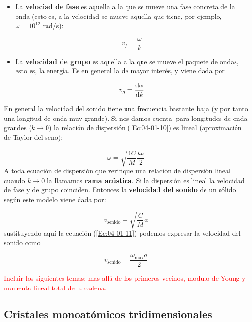 \begin{itemize}
	\item La \textbf{velociad de fase} es aquella a la que se mueve una fase concreta de la onda (esto es, a la velocidad se mueve aquella que tiene, por ejemplo, $\omega=10^{12}$ rad/s):
	
	\begin{equation}
		v_f = \frac{\omega}{k}
	\end{equation}
	\item La \textbf{velocidad de grupo} es aquella a la que se mueve el paquete de ondas, esto es, la energía. Es en general la de mayor interés, y viene dada por
	
	\begin{equation}
		v_g = \frac{\mathrm{d} \omega}{\mathrm{d} k}
	\end{equation}
\end{itemize}
En general la velocidad del sonido tiene una frecuencia bastante baja (y por tanto una longitud de onda muy grande). Si nos damos cuenta, para longitudes de onda grandes ($k\rightarrow 0$) la relación de dispersión (\ref{Ec:04-01-10}) es lineal (aproximación de Taylor del seno):

\begin{equation}
	\omega = \sqrt{\frac{4C}{M}} \frac{ka}{2}
\end{equation}
A toda ecuación de dispersión que verifique una relación de dispersión lineal cuando $k\rightarrow0$ la llamamos \textbf{rama acústica}. Si la dispersión es lineal la velocidad de fase y de grupo coinciden. Entonces la \textbf{velocidad del sonido} de un sólido según este modelo viene dada por:

\begin{equation}
	v_{\text{sonido}} = \sqrt{\frac{C}{M}} a
\end{equation}
sustituyendo aquí la ecuación (\ref{Ec:04-01-11}) podemos expresar la velocidad del sonido como

\begin{equation}
	v_{\text{sonido}} = \frac{ \omega_{\max} a}{2}
\end{equation}

\begin{Anotacion}
	\textcolor{red}{Incluir los siguientes temas: mas allá de los primeros vecinos, modulo de Young y momento lineal total de la cadena.}
\end{Anotacion}


\subsection{Cristales monoatómicos tridimensionales}

